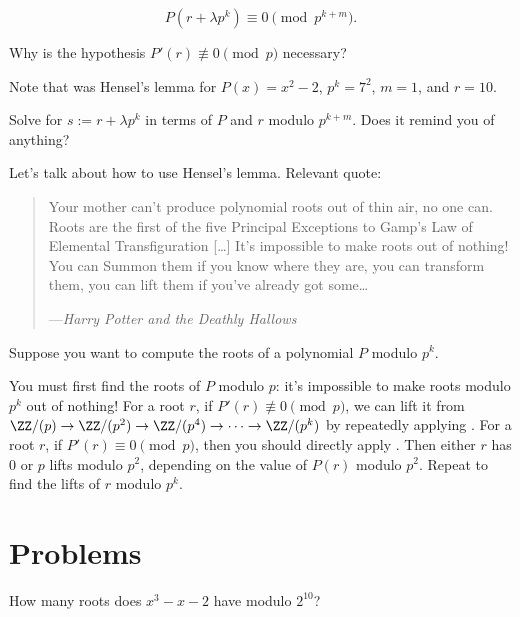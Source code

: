 \documentclass[11pt]{scrartcl}
\begin{document}
\begin{theorem}
    \[P(r + \lambda p^k) \equiv 0 \pmod{p^{k + m}}.\]
\end{theorem}

Why is the hypothesis $P'(r) \not\equiv 0 \pmod p$ necessary?

Note that  was Hensel's lemma for $P(x) = x^2 - 2$, $p^k = 7^2$, $m = 1$, and $r = 10$.

\begin{exercise}\label{exa:explicit_formula}
    Solve for $s := r + \lambda p^k$ in terms of $P$ and $r$ modulo $p^{k + m}$. Does it remind you of anything?
\end{exercise}

Let's talk about how to use Hensel's lemma. Relevant quote:

\begin{quote}
	\sffamily\small
	Your mother can't produce polynomial roots out of thin air, no one can. Roots are the first of the five Principal Exceptions to Gamp's Law of Elemental Transfiguration [\dots] It's impossible to make roots out of nothing! You can Summon them if you know where they are, you can transform them, you can lift them if you've already got some\dots

	---\emph{Harry Potter and the Deathly Hallows}
\end{quote}

Suppose you want to compute the roots of a polynomial $P$ modulo $p^k$.
\begin{itemize}
	\ii You must first find the roots of $P$ modulo $p$: it's impossible to make roots modulo $p^k$ out of nothing!
	\ii For a root $r$, if $P'(r) \not\equiv 0 \pmod p$, we can lift it from $\ZZ/(p) \to \ZZ/(p^2) \to \ZZ/(p^4) \to \dots \to \ZZ/(p^k)$ by repeatedly applying .
	\ii For a root $r$, if $P'(r) \equiv 0 \pmod p$, then you should directly apply . Then either $r$ has $0$ or $p$ lifts modulo $p^2$, depending on the value of $P(r)$ modulo $p^2$. Repeat to find the lifts of $r$ modulo $p^k$.
\end{itemize}

\section{Problems}

\begin{exercise}[Brilliant]\label{exe:root_counting}
    How many roots does $x^3 - x - 2$ have modulo $2^{10}$?
\end{exercise}
\end{document}
